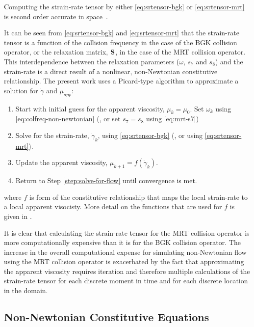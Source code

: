 \noindent Computing the strain-rate tensor by either \eqref{eq:srtensor-bgk} or \eqref{eq:srtensor-mrt} is second order accurate in space~\cite{kruger2009shear,kruger2010second}.

It can be seen from \eqref{eq:srtensor-bgk} and \eqref{eq:srtensor-mrt} that the strain-rate tensor is a function of the collision frequency in the case of the BGK collision operator, or the relaxation matrix, $\mathbf{S}$, in the case of the MRT collision operator.
This interdependence between the relaxation parameters ($\omega$, $s_7$ and $s_8$) and the strain-rate is a direct result of a nonlinear, non-Newtonian constitutive relationship.
The present work uses a Picard-type algorithm to approximate a solution for $\dot{\gamma}$ and $\mu_{app}$:

\label{sec:picard}
\begin{enumerate}
	\item Start with initial guess for the apparent viscosity, $\mu_k = \mu_0$.
	      Set $\omega_k$ using \eqref{eq:colfreq-non-newtonian} (, or set $s_7 = s_8$ using \eqref{eq:mrt-s7})
	\item \label{step:solve-for-flow} Solve for the strain-rate, $\dot{\gamma}_k$, using \eqref{eq:srtensor-bgk} (, or using \eqref{eq:srtensor-mrt}).
	\item Update the apparent viscosity, $\mu_{k+1} = f(\dot{\gamma}_k)$.
	\item Return to Step \ref{step:solve-for-flow} until convergence is met.
\end{enumerate}
\noindent where $f$ is form of the constitutive relationship that maps the local strain-rate to a local apparent visocisty.
More detail on the functions that are used for $f$ is given in .

It is clear that calculating the strain-rate tensor for the MRT collision operator is more computationally expensive than it is for the BGK collision operator.
The increase in the overall computational expense for simulating non-Newtonian flow using the MRT collision operator is exacerbated by the fact that approximating the apparent viscosity requires iteration and therefore multiple calculations of the strain-rate tensor for each discrete moment in time and for each discrete location in the domain.

\subsection{Non-Newtonian Constitutive Equations} \label{sec:constit}

